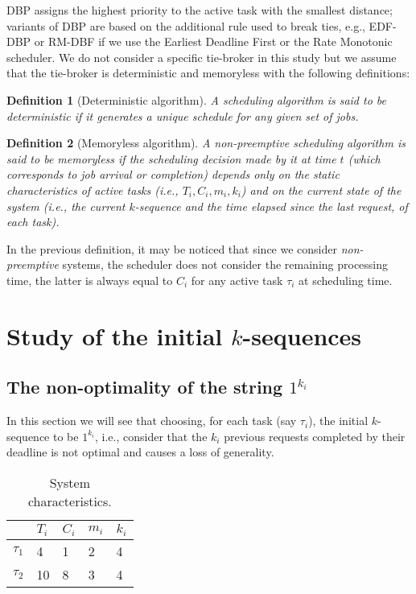 \documentclass{article}
\newtheorem{Definition}{Definition}
\begin{document}
DBP assigns the highest priority to the active task with the smallest distance; variants of DBP are based on the additional rule used to break ties, e.g., EDF-DBP or RM-DBF if we use the Earliest Deadline First or the Rate Monotonic scheduler. We do not consider a specific tie-broker in this study but we assume that the tie-broker is deterministic and memoryless with the following definitions:

\begin{Definition}[Deterministic algorithm]\label{detAlg} 
A scheduling algorithm is said to
be \emph{deterministic} if it generates a unique schedule for any
given set of jobs.
\end{Definition}

\begin{Definition}[Memoryless algorithm]\label{def:memoryless} 
  A non-preemptive scheduling algorithm is said to be \emph{memoryless} if the
  scheduling decision made by it at time $t$ (which corresponds to job arrival or completion) depends only on the static characteristics of active tasks (i.e., $T_{i}, C_{i}, m_{i}, k_{i}$) and on the current state of the system (i.e., the current $k$-sequence and the time elapsed since the last request, of each task).
\end{Definition}

In the previous definition, it may be noticed that since we consider \emph{non-preemptive} systems, the scheduler does not consider the remaining processing time, the latter is always equal to $C_{i}$ for any active task $\tau_{i}$ at scheduling time.

\section{Study of the initial $k$-sequences}\label{sec:counterexample}
\subsection{The non-optimality of the string $1^{k_{i}}$}

In this section we will see that choosing, for each task (say $\tau_{i}$), the initial $k$-sequence to be $1^{k_{i}}$, i.e., consider that the $k_{i}$ previous requests completed by their deadline is not optimal and causes a loss of generality.

\begin{table}
\begin{center}
\begin{tabular}{|lllll|}
\hline
& $T_{i}$ & $C_{i}$ & $m_{i}$ & $k_{i}$\\
\hline
$\tau_{1}$ & 4 & 1 & 2 & 4\\
$\tau_{2}$ & 10 & 8 & 3 & 4\\
\hline
\end{tabular}
\end{center}
\caption{System characteristics.\label{table:example1}}
\end{table}
\end{document}
